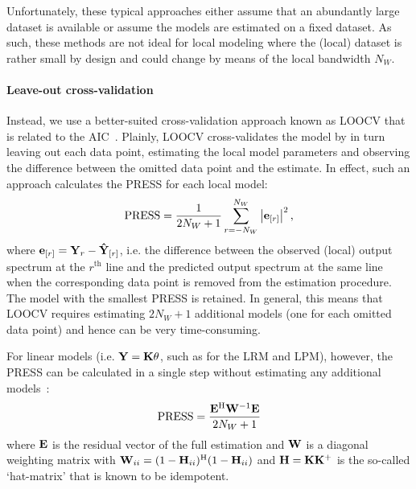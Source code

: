 \begin{remark}
Unfortunately, these typical approaches either assume that an abundantly large dataset is available or  assume the models are estimated on  a fixed dataset.
As such, these methods are not ideal for local modeling where the (local) dataset is rather small by design and could change by means of the local bandwidth $N_W$.
\end{remark}

\paragraph{Leave-out cross-validation}
Instead, we use a better-suited cross-validation approach known as \gls{LOOCV} that is related to the \gls{AIC}~\citep{Stone1977}.
Plainly, \gls{LOOCV} cross-validates the model by in turn leaving out each data point, estimating the local model parameters and observing the difference between the omitted data point and the estimate.
In effect, such an approach calculates the \gls{PRESS} for each local model:
\begin{equation}
 \PRESS = \frac{1}{2N_W+1} \sum_{r=-N_W}^{N_W} 
                          \abs{\ignoring{r}{\LocalVector{e}}}^2
                          \text{,}
\label{eq:PRESS-general}
\end{equation}
where $\ignoring{r}{\LocalVector{e}} = \LocalVector{Y}_{r} - \ignoring{r}{\LocalVector{\hat{Y}}}$, i.e. the difference between the observed (local) output spectrum at the $r^{\text{th}}$ line and the predicted output spectrum at the same line when the corresponding data point is removed from the estimation procedure.
The model with the smallest \gls{PRESS} is retained.
In general, this means that \gls{LOOCV} requires estimating $2N_W + 1$ additional models (one for each omitted data point) and hence can be very time-consuming.

For linear models (i.e. $\LocalVector{Y} = \LocalVector{K} \LocalVector{\theta}$, such as for the \gls{LRM} and \gls{LPM}), however, the \gls{PRESS} can be calculated in a single step without estimating any additional models~\citep[Sec.~12.3.2]{Seber2003}:
\begin{equation}
\PRESS = \frac{\LocalVector{E}^{\HT} \LocalVector{W}^{-1} \LocalVector{E}}{2N_W + 1}
\end{equation}
where $\LocalVector{E}$ is the residual vector of the full estimation and $\LocalVector{W}$ is a diagonal weighting matrix with $\LocalVector{W}_{ii} = (1 - \LocalVector{H}_{ii})^{\HT} (1 - \LocalVector{H}_{ii})$ and
$\LocalVector{H} = \LocalVector{K} \pinv{\LocalVector{K}}$ is the so-called `hat-matrix' that is known to be idempotent.

